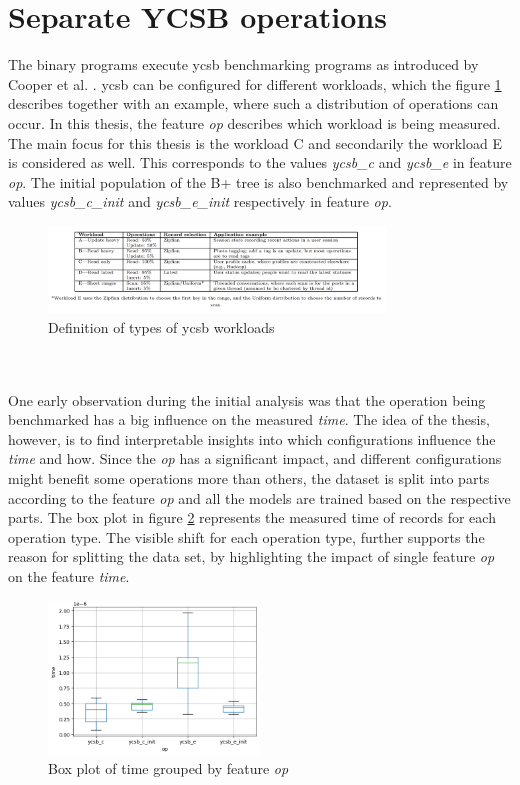 \section{Separate YCSB operations}\label{subsec:ycsb}

The binary programs execute \ac{ycsb} benchmarking programs as introduced by Cooper et al. \parencite{ycsb}. \ac{ycsb} can be configured for different workloads, which the figure \ref{fig:ycsb} describes together with an example, where such a distribution of operations can occur. In this thesis, the feature \textit{op} describes which workload is being measured. The main focus for this thesis is the workload C and secondarily the workload E is considered as well. This corresponds to the values \textit{ycsb\_c} and \textit{ycsb\_e} in feature \textit{op}. The initial population of the B+ tree is also benchmarked and represented by values \textit{ycsb\_c\_init} and \textit{ycsb\_e\_init} respectively in feature \textit{op}.
\begin{figure}[h]
  \centering
  \includegraphics[width=0.8\textwidth]{images/ycsb.png}
  \caption{Definition of types of \ac{ycsb} workloads \parencite{ycsb}}
  \label{fig:ycsb}
\end{figure} 
\\\\
One early observation during the initial analysis was that the operation being benchmarked has a big influence on the measured \textit{time}. The idea of the thesis, however, is to find interpretable insights into which configurations influence the \textit{time} and how. Since the \textit{op} has a significant impact, and different configurations might benefit some operations more than others, the dataset is split into parts according to the feature \textit{op} and all the models are trained based on the respective parts. The box plot in figure \ref{fig:optime} represents the measured time of records for each operation type. The visible shift for each operation type, further supports the reason for splitting the data set, by highlighting the impact of single feature \textit{op} on the feature \textit{time}.

\begin{figure}[h]
  \centering
  \includegraphics[width=0.5\textwidth]{images/boxplot_op.png}
  \caption{Box plot of time grouped by feature \textit{op}}
  \label{fig:optime}
\end{figure} 